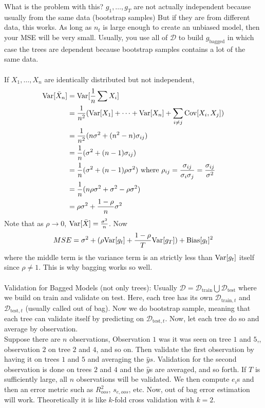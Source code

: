 \documentclass[12pt]{article}
\begin{document}
What is the problem with this? $g_1,\dots,g_T$ are not actually independent because usually from the same data (bootstrap samples) But if they are from different data, this works. As long as $n_t$ is large enough to create an unbiased model, then your MSE will be very small. Usually, you use all of $\mathcal{D}$ to build $g_{\text{bagged}}$ in which case the trees are dependent because bootstrap samples contains a lot of the same data. \\~\\
If $X_1,\dots,X_n$ are identically distributed but not independent, $$ \begin{aligned} \mathrm{Var}[ \bar{X}_n ] &= \mathrm{Var}[ \frac{1}{n} \sum X_i ] \\ &= \frac{1}{n^2} (\mathrm{Var}[ X_1 ] + \dots + \mathrm{Var}[ X_n ] + \sum_{i\neq j} \mathrm{Cov}[X_i,X_j]) \\ &= \frac{1}{n^2}(n\sigma^2 + (n^2 -n)\sigma_{ij}) \\ &= \frac{1}{n}(\sigma^2 + (n-1)\sigma_{ij}) \\ &= \frac{1}{n}(\sigma^2 + (n-1)\rho\sigma^2) \text{ where } \rho_{ij} = \frac{\sigma_{ij}}{\sigma_i\sigma_j} = \frac{\sigma_{ij}}{\sigma^2} \\ &= \frac{1}{n}(n\rho\sigma^2 + \sigma^2 - \rho\sigma^2) \\ &= \rho\sigma^2 + \frac{1-\rho}{n}\sigma^2 \end{aligned} $$ Note that as $\rho \to 0$, $\mathrm{Var}[ \bar{X} ] = \frac{\sigma^2}{n}$. Now $$ MSE = \sigma^2 + (\rho\mathrm{Var}[ g_t ] + \frac{1-\rho}{T}\mathrm{Var}[ g_T ]) + \text{Bias}[g_t]^2 $$ where the middle term is the variance term is an strictly less than $\mathrm{Var}[ g_t ]$ itself since $\rho \neq 1$. This is why bagging works so well. \\~\\
Validation for Bagged Models (not only trees): Usually $\mathcal{D} = \mathcal{D}_{\text{train}} \bigcup \mathcal{D}_{\text{test}}$ where we build on train and validate on test. Here, each tree has its own $\mathcal{D}_{\text{train}, t}$ and $\mathcal{D}_{\text{test}, t}$ (usually called out of bag). Now we do bootstrap sample, meaning that each tree can validate itself by predicting on $\mathcal{D}_{\text{test}, t}$. Now, let each tree do so and average by observation. \\ Suppose there are $n$ observations, Observation $1$ was it was seen on tree $1$ and $5$,, observation $2$ on tree $2$ and $4$, and so on. Then validate the first observation by having it on trees $1$ and $5$ and averaging the $\hat{y}s$. Validation for the second observation is done on trees $2$ and $4$ and the $\hat{y}$s are averaged, and so forth. If $T$ is sufficiently large, all $n$ observations will be validated. We then compute $e_i$s and then an error metric such as $R^2_{oos}$, $s_{e,oos}$, etc. Now, out of bag error estimation will work. Theoretically it is like $k$-fold cross validation with $k=2$. 
\end{document}
